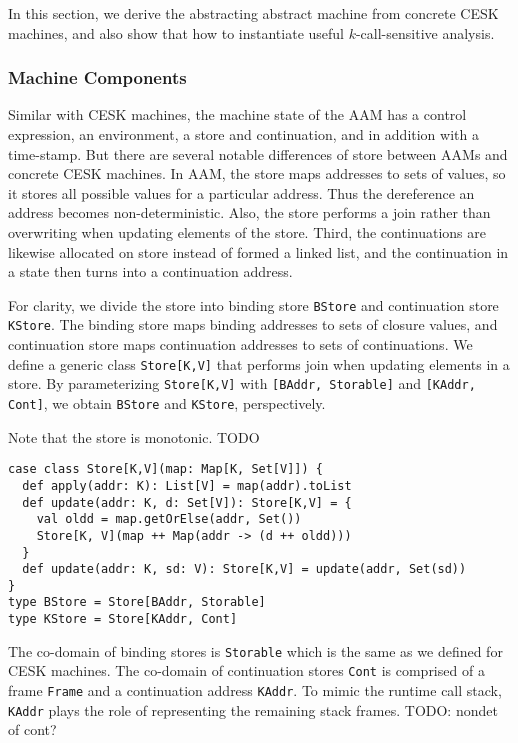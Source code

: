 \documentclass[acmsmall,review,anonymous]{acmart}\settopmatter{printfolios=true,printccs=false,printacmref=false}
\begin{document}
In this section, we derive the abstracting abstract machine from concrete
CESK machines, and also show that how to instantiate
useful $k$-call-sensitive analysis.

\subsubsection{Machine Components}

Similar with CESK machines, the machine state of the AAM has a control expression,
an environment, a store and continuation, and in addition with a time-stamp.
But there are several notable differences of store between AAMs and concrete CESK machines.
In AAM, the store maps addresses to sets of values, so it stores all possible values
for a particular address. Thus the dereference an address becomes non-deterministic.
Also, the store performs a join rather than overwriting when updating elements of the store.
Third, the continuations are likewise allocated on store instead of formed a linked list,
and the continuation in a state then turns into a continuation address.

For clarity, we divide the store into binding store \texttt{BStore} and continuation store \texttt{KStore}. 
The binding store maps binding addresses to sets of closure values, and continuation store maps
continuation addresses to sets of continuations.
We define a generic class \texttt{Store[K,V]} that performs join when updating elements
in a store. By parameterizing \texttt{Store[K,V]} with \texttt{[BAddr, Storable]} and 
\texttt{[KAddr, Cont]}, we obtain \texttt{BStore} and \texttt{KStore}, perspectively.

Note that the store is monotonic. TODO

\begin{verbatim}
case class Store[K,V](map: Map[K, Set[V]]) {
  def apply(addr: K): List[V] = map(addr).toList
  def update(addr: K, d: Set[V]): Store[K,V] = {
    val oldd = map.getOrElse(addr, Set())
    Store[K, V](map ++ Map(addr -> (d ++ oldd)))
  }
  def update(addr: K, sd: V): Store[K,V] = update(addr, Set(sd))
}
type BStore = Store[BAddr, Storable]
type KStore = Store[KAddr, Cont]
\end{verbatim}

The co-domain of binding stores is \texttt{Storable} which is the same
as we defined for CESK machines.
The co-domain of continuation stores \texttt{Cont} is comprised of 
a frame \texttt{Frame} and a continuation address \texttt{KAddr}.
To mimic the runtime call stack, \texttt{KAddr} plays the role of
representing the remaining stack frames.
TODO: nondet of cont?
\end{document}
